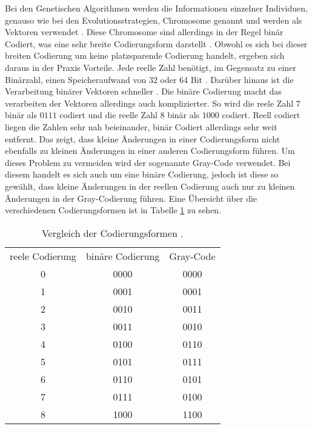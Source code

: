 Bei den Genetischen Algorithmen werden die Informationen einzelner Individuen, genauso wie bei den Evolutionsstrategien, Chromosome genannt und werden als Vektoren verwendet \cite[S. 187-189]{schoeneburg}. Diese Chromosome sind allerdings in der Regel binär Codiert, was eine sehr breite Codierungsform darstellt \cite[S. 191]{schoeneburg}. 
Obwohl es sich bei dieser breiten Codierung um keine platzsparende Codierung handelt, ergeben sich daraus in der Praxis Vorteile. Jede reelle Zahl benötigt, im Gegensatz zu einer Binärzahl, einen Speicheraufwand von 32 oder 64 Bit \cite[S. 191]{schoeneburg}.
Darüber hinaus ist die Verarbeitung binärer Vektoren schneller \cite[S. 191]{schoeneburg}. Die binäre Codierung macht das verarbeiten der Vektoren allerdings auch komplizierter.
So wird die reele Zahl $7$ binär als $0111$ codiert und die reelle Zahl $8$ binär als $1000$ codiert. Reell codiert liegen die Zahlen sehr nah beieinander, binär Codiert allerdings sehr weit entfernt. Das zeigt, dass kleine Änderungen in einer Codierungsform nicht ebenfalls zu kleinen Änderungen in einer anderen Codierungsform führen.
Um dieses Problem zu vermeiden wird der sogenannte Gray-Code verwendet. Bei diesem handelt es sich auch um eine binäre Codierung, jedoch ist diese so gewählt, dass kleine Änderungen in der reellen Codierung auch nur zu kleinen Änderungen in der Gray-Codierung führen. Eine Übersicht über die verschiedenen Codierungsformen ist in Tabelle \ref{tab:codierung} zu sehen.
\begin{table}[!htb]
\centering
\begin{tabular}[h]{c|c|c}
reele Codierung & binäre Codierung & Gray-Code \\
0 & 0000 & 0000 \\
1 & 0001 & 0001 \\
2 & 0010 & 0011 \\
3 & 0011 & 0010 \\
4 & 0100 & 0110 \\
5 & 0101 & 0111 \\
6 & 0110 & 0101 \\
7 & 0111 & 0100 \\
8 & 1000 & 1100 \\
\end{tabular}
\caption{\label{tab:codierung}Vergleich der Codierungsformen \cite[S. 192]{schoeneburg}.}
\end{table}

